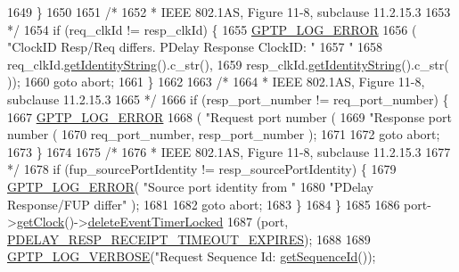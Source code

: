 \begin{DoxyCode}
{{1649         \}
1650 
1651         \textcolor{comment}{/*}
1652 \textcolor{comment}{        * IEEE 802.1AS, Figure 11-8, subclause 11.2.15.3}
1653 \textcolor{comment}{        */}
1654         \textcolor{keywordflow}{if} (req\_clkId != resp\_clkId) \{
1655             \hyperlink{gptp__log_8hpp_afefbb1009717c128012bfeed94842987}{GPTP\_LOG\_ERROR}
1656             ( \textcolor{stringliteral}{"ClockID Resp/Req differs. PDelay Response ClockID: "}
1657               \textcolor{stringliteral}{"%
1658               req\_clkId.\hyperlink{class_clock_identity_a340cfc06879a22b087f117121c347b56}{getIdentityString}().c\_str(),
1659               resp\_clkId.\hyperlink{class_clock_identity_a340cfc06879a22b087f117121c347b56}{getIdentityString}().c\_str( ));
1660             \textcolor{keywordflow}{goto} abort;
1661         \}
1662 
1663         \textcolor{comment}{/*}
1664 \textcolor{comment}{        * IEEE 802.1AS, Figure 11-8, subclause 11.2.15.3}
1665 \textcolor{comment}{        */}
1666         \textcolor{keywordflow}{if} (resp\_port\_number != req\_port\_number) \{
1667             \hyperlink{gptp__log_8hpp_afefbb1009717c128012bfeed94842987}{GPTP\_LOG\_ERROR}
1668             ( \textcolor{stringliteral}{"Request port number (%
1669               \textcolor{stringliteral}{"Response port number (%
1670               req\_port\_number, resp\_port\_number );
1671 
1672             \textcolor{keywordflow}{goto} abort;
1673         \}
1674 
1675         \textcolor{comment}{/*}
1676 \textcolor{comment}{        * IEEE 802.1AS, Figure 11-8, subclause 11.2.15.3}
1677 \textcolor{comment}{        */}
1678         \textcolor{keywordflow}{if} (fup\_sourcePortIdentity != resp\_sourcePortIdentity) \{
1679             \hyperlink{gptp__log_8hpp_afefbb1009717c128012bfeed94842987}{GPTP\_LOG\_ERROR}( \textcolor{stringliteral}{"Source port identity from "}
1680                     \textcolor{stringliteral}{"PDelay Response/FUP differ"} );
1681 
1682             \textcolor{keywordflow}{goto} abort;
1683         \}
1684     \}
1685 
1686     port->\hyperlink{class_common_port_ab8e59ecfb51ec14e166bc8bfc872b1ef}{getClock}()->\hyperlink{class_i_e_e_e1588_clock_ab3079a65b0509eeb40c2828fa6a7834a}{deleteEventTimerLocked}
1687         (port, \hyperlink{ieee1588_8hpp_a5667b805d857c6d28f83f6038a0272d3a972d3b6b32edcfdd72c3841ac03b656a}{PDELAY\_RESP\_RECEIPT\_TIMEOUT\_EXPIRES});
1688 
1689     \hyperlink{gptp__log_8hpp_add03384a2a8099b27e07d041cce77e6f}{GPTP\_LOG\_VERBOSE}(\textcolor{stringliteral}{"Request Sequence Id: %
      \hyperlink{class_p_t_p_message_common_abd5cac5701120cbbfc56129b31fa801f}{getSequenceId}());
}}}}}}
\end{DoxyCode}
